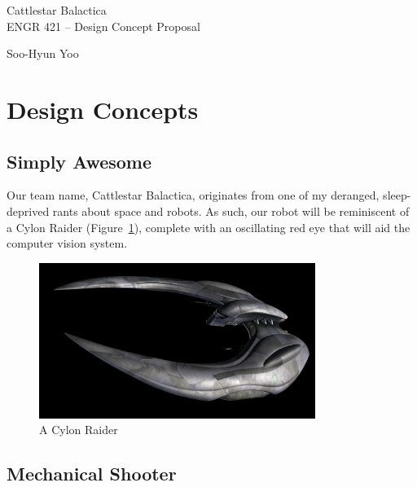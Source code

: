 \documentclass[10pt,letterpaper]{article}
\begin{document}
\begin{titlepage}
	\vspace*{4cm}
	\begin{flushright}
	{\huge
		Cattlestar Balactica \\ [1cm]
	}
	{\large
		ENGR 421 -- Design Concept Proposal \\ [3cm]
	}
	\end{flushright}

	\begin{flushright}
	Soo-Hyun Yoo
	\end{flushright}

\end{titlepage}

\newpage

\section*{Design Concepts}

\subsection*{Simply Awesome}

Our team name, Cattlestar Balactica, originates from one of my deranged,
sleep-deprived rants about space and robots. As such, our robot will be
reminiscent of a Cylon Raider (Figure~\ref{fig:raider}), complete with an
oscillating red eye that will aid the computer vision system.

\begin{figure}[!h]
	\centering
	\includegraphics[width=0.8\textwidth]{raider.jpg}
	\caption{A Cylon Raider}
	\label{fig:raider}
\end{figure}

\subsection*{Mechanical Shooter}
\end{document}

